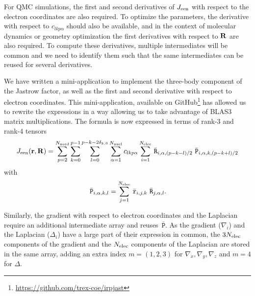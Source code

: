For \ac{QMC} simulations, the first and second derivatives of $J_{\text{een}}$ with
respect to the electron coordinates are also required. To optimize the
parameters, the derivative with respect to $c_{lkp\alpha}$
should also be available, and in the context of molecular dynamics or
geometry optimization the first derivatives with respect to $\mathbf{R}$ are
also required. To compute these derivatives, multiple intermediates
will be common and we need to identify them such that the same
intermediates can be reused for several derivatives.

We have written a mini-application to implement the three-body component
of the Jastrow factor, as well as the first and second derivative with
respect to electron coordinates. This mini-application, available on
GitHub\footnote{\url{https://github.com/trex-coe/irpjast}} has allowed us to
rewrite the expressions in a way allowing us to take advantage of BLAS3
matrix multiplications. The formula is now expressed in terms of
rank-3 and rank-4 tensors
\newcommand{\tr}{\, \bar{\mathtt{r}}}
\newcommand{\tR}{\, \bar{\mathtt{R}}}
\newcommand{\tP}{\, \bar{\mathtt{P}}}
\[
  \Jeen(\br,\bR) = 
  \sum_{p=2}^{\Nord}\sum_{k=0}^{p-1}
  \sum_{l=0}^{\lmax} 
    \sum_{\alpha=1}^{\Nat}
    c_{lkp\alpha}
    \sum_{i=1}^{\Nel}
    {\tR}_{i,\alpha,(p-k-l)/2}\,
  {\tP}_{i,\alpha,k,(p-k+l)/2}
  \]
with 
  \[
  {\tP}_{i, \alpha, k, l} = \sum_{j=1}^{\Nel} {\tr}_{i,j,k}\,{\tR}_{j,\alpha,l}.
  \]
  
Similarly, the gradient with respect to electron coordinates and the
Laplacian require an additional intermediate array and reuses ${\tP}$. As
the gradient ($\nabla_{i}$) and the Laplacian ($\Delta_i$) have a
large part of their expression in common, the $3N_{\text{elec}}$ components of
the gradient and the $N_{\text{elec}}$ components of the Laplacian are stored in
the same array, adding an extra index $m=(1,2,3)$ for $\nabla_x,
\nabla_y,\nabla_z$
and $m=4$ for $\Delta$.

\newcommand{\tg}{\, \bar{\mathtt{g}}}
\newcommand{\tG}{\, \bar{\mathtt{G}}}
\newcommand{\tQ}{\, \bar{\mathtt{Q}}}

